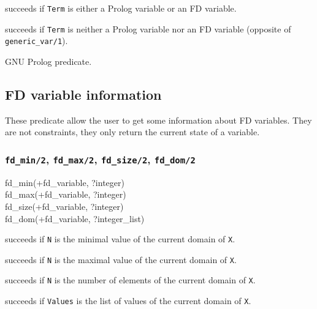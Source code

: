  succeeds if \texttt{Term} is
either a Prolog variable or an FD variable.

 succeeds if
\texttt{Term} is neither a Prolog variable nor an FD variable
(opposite of \texttt{generic\_var/1}).

\PlErrorsNone

\Portability

GNU Prolog predicate.

\subsection{FD variable information}
These predicate allow the user to get some information about FD variables.
They are not constraints, they only return the current state of a variable.

\subsubsection{\texttt{fd\_min/2},
\texttt{fd\_max/2},
\texttt{fd\_size/2},
\texttt{fd\_dom/2}}

\begin{TemplatesOneCol}
fd\_min(+fd\_variable, ?integer)\\
fd\_max(+fd\_variable, ?integer)\\
fd\_size(+fd\_variable, ?integer)\\
fd\_dom(+fd\_variable, ?integer\_list)

\end{TemplatesOneCol}

\Description

 succeeds if \texttt{N} is the minimal value of the
current domain of \texttt{X}.

 succeeds if \texttt{N} is the maximal value of the
current domain of \texttt{X}.

 succeeds if \texttt{N} is the number of elements of
the current domain of \texttt{X}.

 succeeds if \texttt{Values} is the list of
values of the current domain of \texttt{X}.

\begin{PlErrors}






\end{PlErrors}

